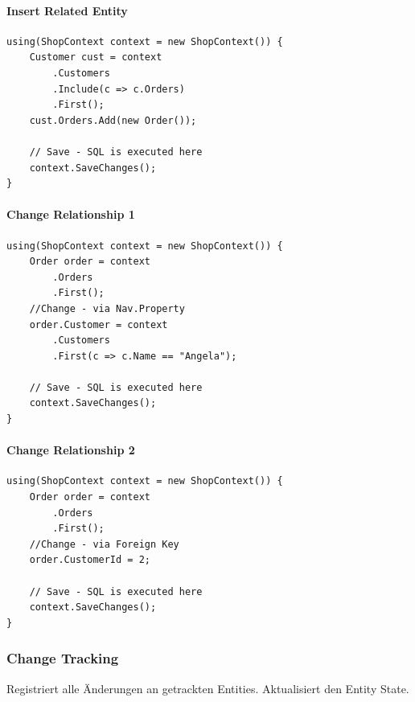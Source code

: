 \documentclass[
a4paper,
oneside,
10pt,
fleqn,
headsepline,
toc=listofnumbered, 
bibliography=totocnumbered]{scrartcl}
\begin{document}
\paragraph{Insert Related Entity}
\begin{lstlisting}
using(ShopContext context = new ShopContext()) {
    Customer cust = context
        .Customers
        .Include(c => c.Orders)
        .First();
    cust.Orders.Add(new Order());
    
    // Save - SQL is executed here
    context.SaveChanges();
}
\end{lstlisting}

\paragraph{Change Relationship 1}
\begin{lstlisting}
using(ShopContext context = new ShopContext()) {
    Order order = context
        .Orders
        .First();
    //Change - via Nav.Property
    order.Customer = context
        .Customers
        .First(c => c.Name == "Angela");
    
    // Save - SQL is executed here
    context.SaveChanges();
}
\end{lstlisting}

\paragraph{Change Relationship 2}
\begin{lstlisting}
using(ShopContext context = new ShopContext()) {
    Order order = context
        .Orders
        .First();
    //Change - via Foreign Key
    order.CustomerId = 2;
    
    // Save - SQL is executed here
    context.SaveChanges();
}
\end{lstlisting}

\subsubsection{Change Tracking}
Registriert alle Änderungen an getrackten Entities. Aktualisiert den Entity State.
\end{document}
